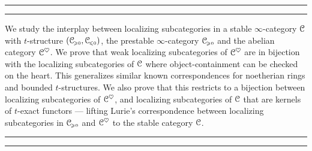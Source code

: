 

\vspace*{5cm}

{\par{}\par}
\vspace{-2em}
\rule[-11pt]{\textwidth}{1pt}
\rule{\textwidth}{0.5pt}
    
We study the interplay between localizing subcategories in a stable $\infty$-category $\EuScript{C}$ with $t$-structure $(\EuScript{C}_{\hspace{-1pt}\scriptscriptstyle\geqslant 0}, \EuScript{C}_{\hspace{-1pt}\scriptscriptstyle\leqslant 0})$, the prestable $\infty$-category $\EuScript{C}_{\hspace{-1pt}\scriptscriptstyle\geqslant 0}$ and the abelian category $\EuScript{C}^\heartsuit$. We prove that weak localizing subcategories of $\EuScript{C}^\heartsuit$ are in bijection with the localizing subcategories of $\EuScript{C}$ where object-containment can be checked on the heart. This generalizes similar known correspondences for noetherian rings and bounded $t$-structures. We also prove that this restricts to a bijection between localizing subcategories of $\EuScript{C}^\heartsuit$, and localizing subcategories of $\EuScript{C}$ that are kernels of $t$-exact functors --- lifting Lurie's correspondence between localizing subcategories in $\EuScript{C}_{\hspace{-1pt}\scriptscriptstyle\geqslant 0}$ and $\EuScript{C}^\heartsuit$ to the stable category $\EuScript{C}$. 

\rule{\textwidth}{0.5pt}
\rule[11pt]{\textwidth}{1pt}
\vspace{\fill}

